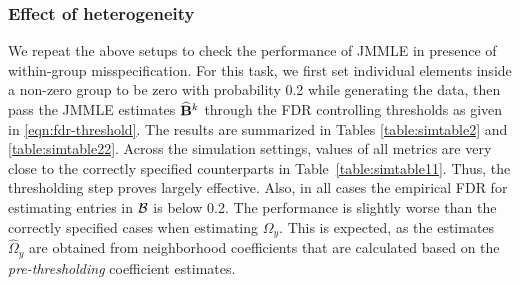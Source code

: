 \subsubsection{Effect of heterogeneity}
We repeat the above setups to check the performance of JMMLE in presence of within-group misspecification. For this task, we first set individual elements inside a non-zero group to be zero with probability 0.2 while generating the data, then pass the JMMLE estimates $\widehat {{\mathbf{B}}}^k$ through the FDR controlling thresholds as given in \eqref{eqn:fdr-threshold}. The results are summarized in Tables \ref{table:simtable2} and \ref{table:simtable22}. Across the simulation settings, values of all metrics are very close to the correctly specified counterparts in Table~\ref{table:simtable11}. Thus, the thresholding step 
proves largely effective. Also, in all cases the empirical FDR for estimating entries in ${\cal{B}}$ is below 0.2. The performance is slightly worse than the correctly specified cases when estimating $\Omega_y$. This is expected, as the estimates $\widehat \Omega_y$ are obtained from neighborhood coefficients that are calculated based on the {\it pre-thresholding} coefficient estimates.
